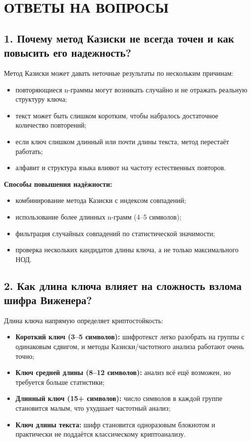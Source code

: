 \chapter*{ОТВЕТЫ НА ВОПРОСЫ}

\section*{1. Почему метод Казиски не всегда точен и как повысить его надежность?}

Метод Казиски может давать неточные результаты по нескольким причинам:

\begin{itemize}
    \item повторяющиеся n-граммы могут возникать случайно и не отражать реальную структуру ключа;
    \item текст может быть слишком коротким, чтобы набралось достаточное количество повторений;
    \item если ключ слишком длинный или почти длины текста, метод перестаёт работать;
    \item алфавит и структура языка влияют на частоту естественных повторов.
\end{itemize}

\textbf{Способы повышения надёжности:}

\begin{itemize}
    \item комбинирование метода Казиски с индексом совпадений;
    \item использование более длинных n-грамм (4--5 символов);
    \item фильтрация случайных совпадений по статистической значимости;
    \item проверка нескольких кандидатов длины ключа, а не только максимального НОД.
\end{itemize}

\section*{2. Как длина ключа влияет на сложность взлома шифра Виженера?}

Длина ключа напрямую определяет криптостойкость:

\begin{itemize}
    \item \textbf{Короткий ключ (3--5 символов):} шифротекст легко разобрать на группы с одинаковым сдвигом, и методы Казиски/частотного анализа работают очень точно;
    \item \textbf{Ключ средней длины (8--12 символов):} анализ всё ещё возможен, но требуется больше статистики;
    \item \textbf{Длинный ключ (15+ символов):} число символов в каждой группе становится малым, что ухудшает частотный анализ;
    \item \textbf{Ключ длины текста:} шифр становится одноразовым блокнотом и практически не поддаётся классическому криптоанализу.
\end{itemize}

